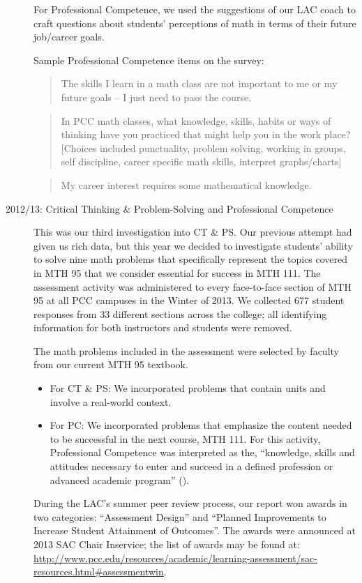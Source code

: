 \begin{description}
For Professional Competence, we used the suggestions of our LAC coach to craft
questions about students' perceptions of math in terms of their future
job/career goals. 

Sample Professional Competence items on the survey:
\begin{quote}
The skills I learn in a math class are not important to me or my future goals --
I just need to pass the course.
\end{quote}
\begin{quote}
In PCC math classes, what knowledge, skills, habits or ways of thinking have you
practiced that might help you in the work place? [Choices included punctuality,
problem solving, working in groups, self discipline, career specific math
skills, interpret graphs/charts]
\end{quote}
\begin{quote}
My career interest requires some mathematical knowledge.
\end{quote}

\item[2012/13:  Critical Thinking \& Problem-Solving and Professional Competence]

This was our third investigation into CT \& PS.  Our previous attempt had given
us rich data, but this year we decided to investigate students' ability to solve
nine math problems that specifically represent the topics covered in MTH 95 that
we consider essential for success in MTH 111.  The assessment activity was
administered to every face-to-face section of MTH 95 at all PCC campuses in the
Winter of 2013.  We collected 677 student responses from 33 different sections
across the college; all identifying information for both instructors and
students were removed.

The math problems included in the assessment were selected by faculty from our
current MTH 95 textbook.
\begin{itemize}
\item For CT \& PS: We incorporated problems that contain units and involve a
  real-world context.
\item For PC:  We incorporated problems that emphasize the content needed to be
  successful in the next course, MTH 111.  For this activity, Professional
  Competence was interpreted as the, ``knowledge, skills and attitudes necessary
  to enter and succeed in a defined profession or advanced academic program''
  (\cite{coreoutcomes}).
\end{itemize}
During the LAC's summer peer review process, our report won awards in two
categories: ``Assessment Design'' and ``Planned Improvements to Increase Student
Attainment of Outcomes''.  The awards were announced at 2013 SAC Chair
Inservice; the list of awards may be found at:
\url{http://www.pcc.edu/resources/academic/learning-assessment/sac-resources.html#assessmentwin}.

\end{description}

